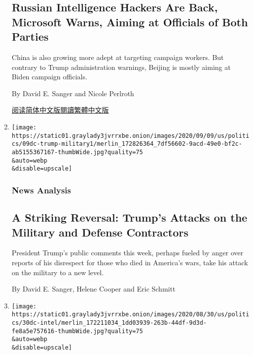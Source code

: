 \begin{enumerate}
{  \subsection{Russian Intelligence Hackers Are Back, Microsoft Warns,
  Aiming at Officials of Both
  Parties}\label{russian-intelligence-hackers-are-back-microsoft-warns-aiming-at-officials-of-both-parties}}

  China is also growing more adept at targeting campaign workers. But
  contrary to Trump administration warnings, Beijing is mostly aiming at
  Biden campaign officials.

  By David E. Sanger and Nicole Perlroth

  \href{https://cn.nytimes3xbfgragh.onion/usa/20200911/microsoft-election-hacking/}{阅读简体中文版}\href{https://cn.nytimes3xbfgragh.onion/usa/20200911/microsoft-election-hacking/zh-hant/}{閱讀繁體中文版}
\item
  \href{/2020/09/09/us/politics/trump-military.html}{}

  \texttt{[image: https://static01.graylady3jvrrxbe.onion/images/2020/09/09/us/politics/09dc-trump-military1/merlin\_172826364\_7df56602-9acd-49e0-bf2c-ab5155367167-thumbWide.jpg?quality=75\\\&auto=webp\\\&disable=upscale]}

  \hypertarget{news-analysis}{%
  \subsubsection{News Analysis}\label{news-analysis}}

  \hypertarget{a-striking-reversal-trumps-attacks-on-the-military-and-defense-contractors}{%
  \subsection{A Striking Reversal: Trump's Attacks on the Military and
  Defense
  Contractors}\label{a-striking-reversal-trumps-attacks-on-the-military-and-defense-contractors}}

  President Trump's public comments this week, perhaps fueled by anger
  over reports of his disrespect for those who died in America's wars,
  take his attack on the military to a new level.

  By David E. Sanger, Helene Cooper and Eric Schmitt
\item
  \href{/2020/08/31/us/elections/a-shift-on-election-briefings-to-congress-could-create-an-information-gap-for-voters.html}{}

  \texttt{[image: https://static01.graylady3jvrrxbe.onion/images/2020/08/30/us/politics/30dc-intel/merlin\_172211034\_1dd03939-263b-44df-9d3d-fe8a5e757616-thumbWide.jpg?quality=75\\\&auto=webp\\\&disable=upscale]}


\end{enumerate}

